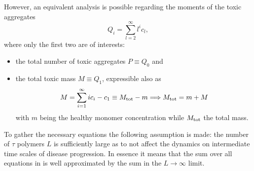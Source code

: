 \documentclass{article}
\begin{document}
                However, an equivalent analysis is possible regarding the moments of the toxic aggregates
                \begin{equation}
                    Q_i=\sum_{l=2}^{\infty}l^ic_l,
                    \label{eqMomentDefinition}
                \end{equation}
                where only the first two are of interests:
                \begin{itemize}[%
                    topsep=7.5pt,	  %
                    itemsep=-2pt,	  %
                    leftmargin=20pt,  %
                    rightmargin=0pt,  %
                ]
                    \item the total number of toxic aggregates $P\equiv Q_0$ and
                    \item the total toxic mass $M\equiv Q_1$, expressible also as
                    \begin{equation}
                        M=\sum_{i=1}^\infty ic_i-c_1\equiv\TotM-m
                        \implies\TotM=m+M
                        \label{eqDecompositionTotalMass}
                    \end{equation}
                    with $m$ being the healthy monomer concentration while $M_{\text{tot}}$ the total mass.
                \end{itemize}

                To gather the necessary equations the following assumption is made: the number of $\tau$ polymers $L$ is sufficiently large as to not affect the dynamics on intermediate time scales of disease progression. \cite[§ 5.2]{Goriely2019} In essence it means that the sum over all equations in \SMOcontinuous{} is well approximated by the sum in the $L\to\infty$ limit.
\end{document}

